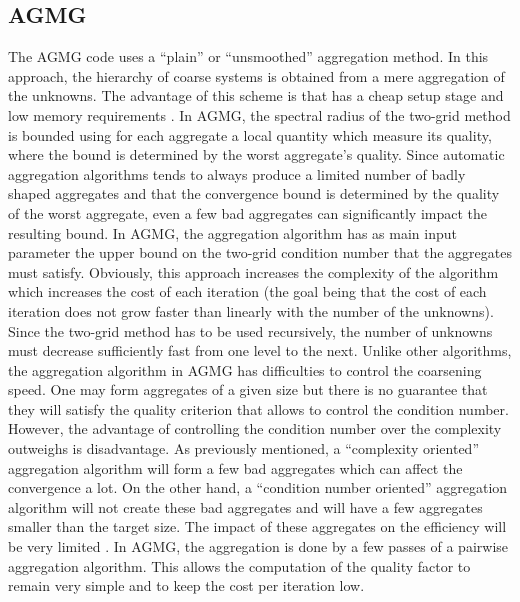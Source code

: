 \subsection{AGMG}
The AGMG code uses a ``plain'' or ``unsmoothed'' aggregation method. In this 
approach, the hierarchy of coarse systems is obtained from a mere aggregation 
of the unknowns. The advantage of this scheme is that has a cheap setup stage 
and low memory requirements \cite{agmg2}. In AGMG, the spectral radius of the
two-grid method is bounded using for each aggregate a local quantity which measure 
its quality, where the bound is determined by the worst aggregate's quality. 
Since automatic aggregation algorithms tends to always produce a limited number 
of badly shaped aggregates and that the convergence bound is determined by the 
quality of the worst aggregate, even a few bad aggregates can significantly impact 
the resulting bound. In AGMG, the aggregation algorithm has as main input
parameter the upper bound on the two-grid condition number that the aggregates
must satisfy. Obviously, this approach increases the complexity of the
algorithm which increases the cost of each iteration (the goal being that the
cost of each iteration does not grow faster than linearly with the number of the
unknowns). Since the two-grid method has to be used recursively, the number of 
unknowns must decrease sufficiently fast from one level to the next. Unlike
other algorithms, the aggregation algorithm in AGMG has difficulties to
control the coarsening speed. One may form aggregates of a given size but
there is no guarantee that they will satisfy the quality criterion that allows
to control the condition number. However, the advantage of controlling the
condition number over the complexity outweighs is disadvantage. As previously
mentioned, a ``complexity oriented'' aggregation algorithm will form a few bad
aggregates which can affect the convergence a lot. On the other hand, a
``condition number oriented'' aggregation algorithm will not create these bad
aggregates and will have a few aggregates smaller than the target size. The
impact of these aggregates on the efficiency will be very limited
\cite{agmg2}. In AGMG, the aggregation is done by a few passes of a pairwise
aggregation algorithm. This allows the computation of the quality factor to
remain very simple and to keep the cost per iteration low.  

